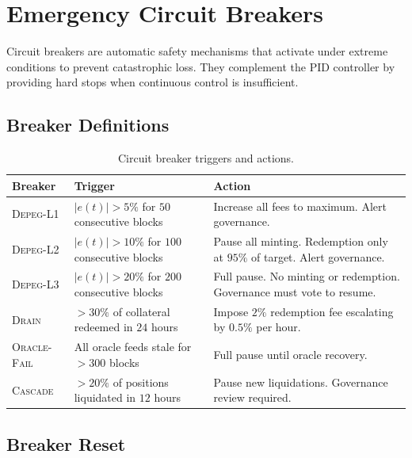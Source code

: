 \documentclass[11pt,a4paper]{article}
\begin{document}
\section{Emergency Circuit Breakers}
\label{sec:circuit}

Circuit breakers are automatic safety mechanisms that activate under extreme conditions to prevent catastrophic loss.
They complement the PID controller by providing hard stops when continuous control is insufficient.

\subsection{Breaker Definitions}

\begin{table}[H]
\centering
\caption{Circuit breaker triggers and actions.}
\label{tab:breakers}
\begin{tabular}{@{}p{3cm}p{4.5cm}p{5cm}@{}}
\toprule
\textbf{Breaker} & \textbf{Trigger} & \textbf{Action} \\
\midrule
\textsc{Depeg-L1} & $|e(t)| > 5\%$ for $50$ consecutive blocks & Increase all fees to maximum. Alert governance. \\
\addlinespace
\textsc{Depeg-L2} & $|e(t)| > 10\%$ for $100$ consecutive blocks & Pause all minting. Redemption only at $95\%$ of target. Alert governance. \\
\addlinespace
\textsc{Depeg-L3} & $|e(t)| > 20\%$ for $200$ consecutive blocks & Full pause. No minting or redemption. Governance must vote to resume. \\
\addlinespace
\textsc{Drain} & $>30\%$ of collateral redeemed in $24$ hours & Impose $2\%$ redemption fee escalating by $0.5\%$ per hour. \\
\addlinespace
\textsc{Oracle-Fail} & All oracle feeds stale for $>300$ blocks & Full pause until oracle recovery. \\
\addlinespace
\textsc{Cascade} & $>20\%$ of positions liquidated in $12$ hours & Pause new liquidations. Governance review required. \\
\bottomrule
\end{tabular}
\end{table}

\subsection{Breaker Reset}
\end{document}
